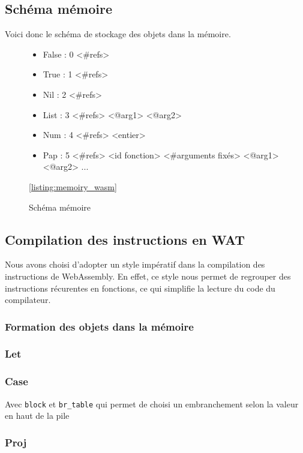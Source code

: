 \documentclass{rapportECL}
\begin{document}
\subsection{Schéma mémoire}

Voici donc le schéma de stockage des objets dans la mémoire.


\begin{figure}[h]
	\begin{itemize}
		\item False : 0 <\#refs>
		\item True  : 1 <\#refs>
		\item Nil   : 2 <\#refs>
		\item List  : 3 <\#refs> <@arg1> <@arg2>
		\item Num   : 4 <\#refs> <entier>
		\item Pap   : 5 <\#refs> <id fonction> <\#arguments fixés> <@arg1> <@arg2> ...
	\end{itemize}
	\caption{Schéma mémoire}
	\ref{listing:memoiry_wasm}
\end{figure}

\subsection{Compilation des instructions en WAT}

Nous avons choisi d'adopter un style impératif dans la compilation des instructions de WebAssembly. En effet, ce style nous permet 
de regrouper des instructions récurentes en fonctions, ce qui simplifie la lecture du code du compilateur.

\subsubsection{Formation des objets dans la mémoire}

\subsubsection{Let}

\subsubsection{Case}

Avec \verb|block| et \verb|br_table| qui permet de choisi un embranchement selon la valeur en haut de la pile

\subsubsection{Proj}
\end{document}
